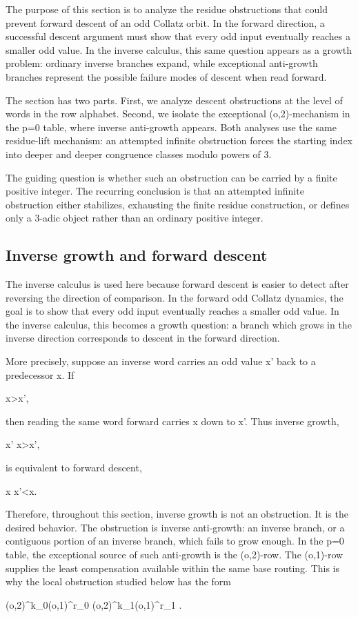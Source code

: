 \documentclass[11pt,letterpaper]{amsart}
\def\({}%
\def\){}%
\def\[{ }%
\def\]{ }%
\theoremstyle{definition}
\theoremstyle{plain}
\theoremstyle{plain}
\theoremstyle{remark}
\begin{document}
The purpose of this section is to analyze the residue obstructions that
could prevent forward descent of an odd Collatz orbit.  In the forward
direction, a successful descent argument must show that every odd input
eventually reaches a smaller odd value.  In the inverse calculus, this
same question appears as a growth problem: ordinary inverse branches
expand, while exceptional anti-growth branches represent the possible
failure modes of descent when read forward.

The section has two parts.  First, we analyze descent obstructions at the
level of words in the row alphabet.  Second, we isolate the exceptional
\((o,2)\)-mechanism in the \(p=0\) table, where inverse anti-growth
appears.  Both analyses use the same residue-lift mechanism: an attempted
infinite obstruction forces the starting index into deeper and deeper
congruence classes modulo powers of \(3\).

The guiding question is whether such an obstruction can be carried by a
finite positive integer.  The recurring conclusion is that an attempted
infinite obstruction either stabilizes, exhausting the finite residue
construction, or defines only a \(3\)-adic object rather than an ordinary
positive integer.

\subsection{Inverse growth and forward descent}
\label{subsec:inverse-growth-forward-descent}

The inverse calculus is used here because forward descent is easier to
detect after reversing the direction of comparison.  In the forward odd
Collatz dynamics, the goal is to show that every odd input eventually
reaches a smaller odd value.  In the inverse calculus, this becomes a
growth question: a branch which grows in the inverse direction corresponds
to descent in the forward direction.

More precisely, suppose an inverse word carries an odd value \(x'\) back
to a predecessor \(x\).  If
\[
x>x',
\]
then reading the same word forward carries \(x\) down to \(x'\).  Thus
inverse growth,
\[
x' \longmapsto x>x',
\]
is equivalent to forward descent,
\[
x \longmapsto x'<x.
\]

Therefore, throughout this section, inverse growth is not an obstruction.
It is the desired behavior.  The obstruction is inverse anti-growth: an
inverse branch, or a contiguous portion of an inverse branch, which fails
to grow enough.  In the \(p=0\) table, the exceptional source of such
anti-growth is the \((o,2)\)-row.  The \((o,1)\)-row supplies the least
compensation available within the same base routing.  This is why the
local obstruction studied below has the form
\[
(o,2)^{k_0}(o,1)^{r_0}
(o,2)^{k_1}(o,1)^{r_1}
\cdots .
\]
\end{document}
